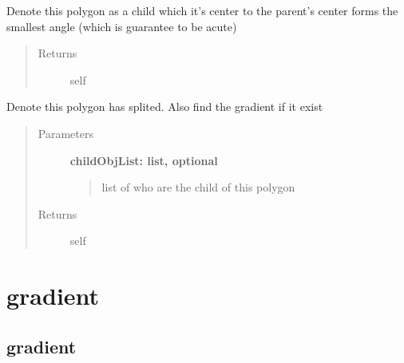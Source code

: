 \documentclass[letterpaper,10pt,english]{sphinxmanual}
\begin{document}
\begin{fulllineitems}
\begin{fulllineitems}
\begin{quote}
\begin{description}
\end{description}\end{quote}

\end{fulllineitems}



\begin{fulllineitems}
Denote this polygon as a child which it's center to the parent's 
center forms the smallest angle (which is guarantee to be acute)
\begin{quote}\begin{description}
\item[{Returns}] \leavevmode
self

\end{description}\end{quote}

\end{fulllineitems}



\begin{fulllineitems}
Denote this polygon has splited.  Also find the gradient if it
exist
\begin{quote}\begin{description}
\item[{Parameters}] \leavevmode
\textbf{childObjList: list, optional}
\begin{quote}

list of  who are the child of this polygon
\end{quote}

\item[{Returns}] \leavevmode
self

\end{description}\end{quote}

\end{fulllineitems}


\end{fulllineitems}



\section{gradient}
\label{modules/mod:gradient}

\subsection{gradient}
\label{modules/gradient:gradient}\label{modules/gradient::doc}
\end{document}
